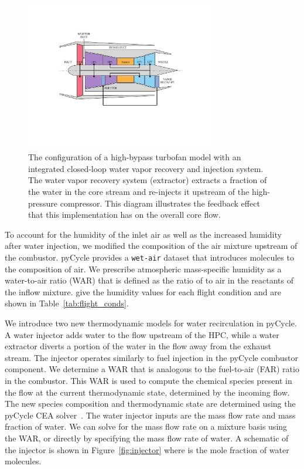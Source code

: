 \documentclass[conf]{new-aiaa}
\begin{document}
\begin{figure}[hbt!]
    \centering
    \includegraphics[width=0.75\textwidth]{turbofan_wvr.pdf}
    \caption{
        The configuration of a high-bypass turbofan model with an integrated closed-loop water vapor recovery and injection system.
        The water vapor recovery system (extractor) extracts a fraction of the water in the core stream and re-injects it upstream of the high-pressure compressor.
        This diagram illustrates the feedback effect that this implementation has on the overall core flow.}
    \label{fig:n3_cycle}
\end{figure}

To account for the humidity of the inlet air as well as the increased humidity after water injection, we modified the composition of the air mixture upstream of the combustor.
pyCycle provides a \texttt{wet-air} dataset that introduces  molecules to the composition of air.
We prescribe atmospheric mass-specific humidity as a water-to-air ratio (WAR) that is defined as the ratio of  to air in the reactants of the inflow mixture.
\citet{Kalnay1996} give the humidity values for each flight condition and are shown in Table~\ref{tab:flight_conds}.

We introduce two new thermodynamic models for water recirculation in pyCycle.
A water injector adds water to the flow upstream of the HPC, while a water extractor diverts a portion of the water in the flow away from the exhaust stream.
The injector operates similarly to fuel injection in the pyCycle combustor component.
We determine a WAR that is analogous to the fuel-to-air (FAR) ratio in the combustor.
This WAR is used to compute the chemical species present in the flow at the current thermodynamic state, determined by the incoming flow.
The new species composition and thermodynamic state are determined using the pyCycle CEA solver~\cite{Gray2017b}.
The water injector inputs are the mass flow rate and mass fraction of water.
We can solve for the mass flow rate on a mixture basis using the WAR, or directly by specifying the mass flow rate of water.
A schematic of the injector is shown in Figure~\ref{fig:injector} where  is the mole fraction of water molecules.
\end{document}
